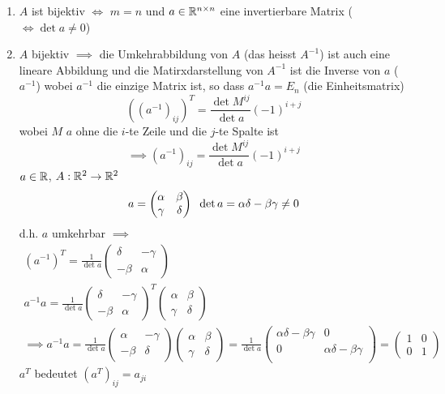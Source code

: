 \begin{Bem}
  \begin{enumerate}
    \item $A$ ist bijektiv $\iff$ $m=n$ und $a\in\mathbb{R}^{n\times n}$ eine invertierbare Matrix ($\iff \det a\neq 0$)
    \item $A$ bijektiv $\implies$ die Umkehrabbildung von $A$ (das heisst $A^{-1}$) ist auch eine lineare Abbildung und die Matirxdarstellung von $A^{-1}$ ist die Inverse von $a$ ($a^{-1}$) wobei $a^{-1}$ die einzige Matrix ist, so dass $a^{-1}a=E_n$ (die Einheitsmatrix)
      \[\left( (a^{-1})_{ij} \right)^T=\frac{\det M^{ij}}{\det a}(-1)^{i+j}\]
      wobei $M$ $a$ ohne die $i$-te Zeile und die $j$-te Spalte ist
      \[\implies (a^{-1})_{ij} =\frac{\det M^{ij}}{\det a}(-1)^{i+j}\]
      $a\in\mathbb{R}$, $A:\mathbb{R}^2\rightarrow\mathbb{R}^2$
      \[a= \begin{pmatrix}
        \alpha&\beta\\
        \gamma&\delta
      \end{pmatrix}\hspace{2mm} \det a = \alpha\delta-\beta\gamma\neq 0\]
      d.h. $a$ umkehrbar $\implies$
      \begin{eqnarray*}
        \left( a^{-1} \right)^T=\frac{1}{\det a} \begin{pmatrix}
          \delta&-\gamma\\
          -\beta&\alpha
        \end{pmatrix}\\
        a^{-1}a=\frac{1}{\det a} \begin{pmatrix}
          \delta&-\gamma\\
          -\beta&\alpha
        \end{pmatrix}^T\begin{pmatrix}
          \alpha&\beta\\
          \gamma&\delta
        \end{pmatrix}\\
        \implies a^{-1}a=\frac{1}{\det a}\begin{pmatrix}
          \alpha&-\gamma\\
          -\beta&\delta
        \end{pmatrix}\begin{pmatrix}
          \alpha&\beta\\
          \gamma&\delta
        \end{pmatrix}
        = \frac{1}{\det a} \begin{pmatrix}
          \alpha\delta-\beta\gamma&0\\
          0&\alpha\delta-\beta\gamma\\
        \end{pmatrix} = \begin{pmatrix}
          1&0\\0&1
        \end{pmatrix}
      \end{eqnarray*}
      $a^T$ bedeutet $(a^T)_{ij}=a_{ji}$
  \end{enumerate}
\end{Bem}
